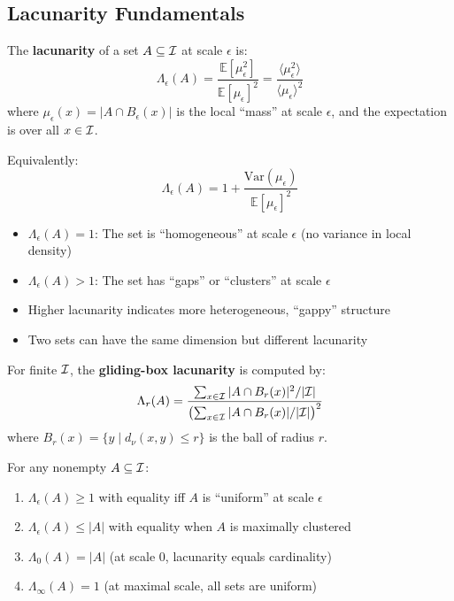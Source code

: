 \subsection{Lacunarity Fundamentals}

\begin{definition}[Lacunarity]
\label{def:lacunarity}
The \textbf{lacunarity} of a set $A \subseteq \mathcal{I}$ at scale $\epsilon$ is:
\[
\Lambda_\epsilon(A) = \frac{\mathbb{E}[\mu_\epsilon^2]}{\mathbb{E}[\mu_\epsilon]^2} = \frac{\langle \mu_\epsilon^2 \rangle}{\langle \mu_\epsilon \rangle^2}
\]
where $\mu_\epsilon(x) = |A \cap B_\epsilon(x)|$ is the local ``mass'' at scale $\epsilon$, and the expectation is over all $x \in \mathcal{I}$.

Equivalently:
\[
\Lambda_\epsilon(A) = 1 + \frac{\mathrm{Var}(\mu_\epsilon)}{\mathbb{E}[\mu_\epsilon]^2}
\]
\end{definition}

\begin{remark}
\label{rem:lacunarity-interpretation}
\begin{itemize}
  \item $\Lambda_\epsilon(A) = 1$: The set is ``homogeneous'' at scale $\epsilon$ (no variance in local density)
  \item $\Lambda_\epsilon(A) > 1$: The set has ``gaps'' or ``clusters'' at scale $\epsilon$
  \item Higher lacunarity indicates more heterogeneous, ``gappy'' structure
  \item Two sets can have the same dimension but different lacunarity
\end{itemize}
\end{remark}

\begin{definition}
\label{def:gliding-box-lacunarity}
For finite $\mathcal{I}$, the \textbf{gliding-box lacunarity} is computed by:
\[
\Lambda_r(A) = \frac{\sum_{x \in \mathcal{I}} |A \cap B_r(x)|^2 / |\mathcal{I}|}{\left(\sum_{x \in \mathcal{I}} |A \cap B_r(x)| / |\mathcal{I}|\right)^2}
\]
where $B_r(x) = \{y \mid d_\nu(x, y) \leq r\}$ is the ball of radius $r$.
\end{definition}

\begin{proposition}
\label{prop:lacunarity-bounds}
For any nonempty $A \subseteq \mathcal{I}$:
\begin{enumerate}[label=(\roman*)]
  \item $\Lambda_\epsilon(A) \geq 1$ with equality iff $A$ is ``uniform'' at scale $\epsilon$
  \item $\Lambda_\epsilon(A) \leq |A|$ with equality when $A$ is maximally clustered
  \item $\Lambda_0(A) = |A|$ (at scale 0, lacunarity equals cardinality)
  \item $\Lambda_\infty(A) = 1$ (at maximal scale, all sets are uniform)
\end{enumerate}
\end{proposition}

